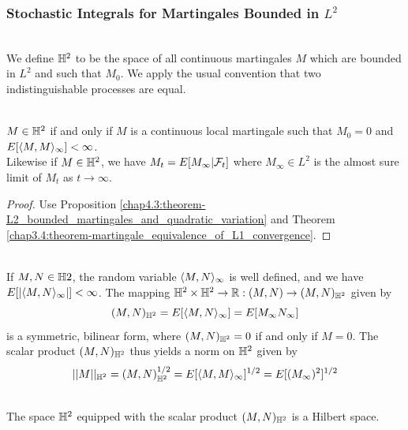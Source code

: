 \subsubsection{Stochastic Integrals for Martingales Bounded in \texorpdfstring{$L^2$}{L2}}
\begin{definition}\label{chap5.1.1:definition-space_of_integrators_H2}
 \\
We define $\mb{H}^2$ to be the space of all continuous martingales $M$ which are bounded in $L^2$ and such that $M_0$. We apply the usual convention that two indistinguishable processes are equal.
\end{definition}

\begin{proposition}[Characteristics of $\mb{H}^2$]\label{chap5.1.1:proposition-characteristics_of_integrators_H2}
 \\
$M \in \mathbb{H}^2$ if and only if $M$ is a continuous local martingale such that $M_0=0$ and $E[\langle M,M\rangle_\infty]< \infty$. \\
Likewise if $M \in \mathbb{H}^2$, we have $M_t=E[M_\infty|\mathcal{F}_t]$ where $M_\infty \in L^2$ is the almost sure limit of $M_t$ as $t \to\infty$.
\end{proposition}
\begin{proof}
Use Proposition \ref{chap4.3:theorem-L2_bounded_martingales_and_quadratic_variation} and Theorem \ref{chap3.4:theorem-martingale_equivalence_of_L1_convergence}.
\end{proof}


\begin{proposition} \label{chap5.1.1:proposition-H2_scalar_product_and_norm}
 \\
If $M,N \in \mathbb{H}2$, the random variable $\langle M,N\rangle_\infty$ is well defined, and we have $E[|\langle M,N\rangle_\infty|]< \infty$. The mapping $\mathbb{H}^2\times\mathbb{H}^2 \to \mathbb{R}: (M,N) \to (M,N)_{\mathbb{H}^2}$ given by
$$(M,N)_{\mathbb{H}^2}=E[\langle M,N\rangle_\infty]=E[M_\infty N_\infty]$$
is a symmetric, bilinear form, where $(M,N)_{\mathbb{H}^2}=0$ if and only if $M=0$. The scalar product $(M,N)_{\mathbb{H}^2}$ thus yields a norm on $\mb{H}^2$ given by
$$||M||_{\mathbb{H}^2}=(M,N)_{\mathbb{H}^2}^{1/2}=E[\langle M,M\rangle_\infty]^{1/2}=E[(M_\infty)^2]^{1/2}$$
\end{proposition}

\begin{proposition}\label{chap5.1.1:proposition-H2_Hilbert_Space}
\\
The space $\mb{H}^2$ equipped with the scalar product $(M,N)_{\mathbb{H}^2}$ is a Hilbert space.
\end{proposition}


